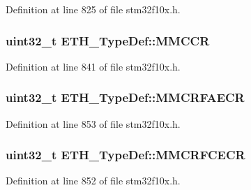 Definition at line 825 of file stm32f10x.\+h.

\subsubsection[{\texorpdfstring{M\+M\+C\+CR}{MMCCR}}]{ {\bf uint32\+\_\+t} E\+T\+H\+\_\+\+Type\+Def\+::\+M\+M\+C\+CR}\hypertarget{struct_e_t_h___type_def_a530d6551e73b9b616d8dc23a53e29708}{}\label{struct_e_t_h___type_def_a530d6551e73b9b616d8dc23a53e29708}


Definition at line 841 of file stm32f10x.\+h.

\subsubsection[{\texorpdfstring{M\+M\+C\+R\+F\+A\+E\+CR}{MMCRFAECR}}]{ {\bf uint32\+\_\+t} E\+T\+H\+\_\+\+Type\+Def\+::\+M\+M\+C\+R\+F\+A\+E\+CR}\hypertarget{struct_e_t_h___type_def_ad057b9031295ab3b64e79145f7607469}{}\label{struct_e_t_h___type_def_ad057b9031295ab3b64e79145f7607469}


Definition at line 853 of file stm32f10x.\+h.

\subsubsection[{\texorpdfstring{M\+M\+C\+R\+F\+C\+E\+CR}{MMCRFCECR}}]{ {\bf uint32\+\_\+t} E\+T\+H\+\_\+\+Type\+Def\+::\+M\+M\+C\+R\+F\+C\+E\+CR}\hypertarget{struct_e_t_h___type_def_afe50f13adc614758cba541f942e8ef0e}{}\label{struct_e_t_h___type_def_afe50f13adc614758cba541f942e8ef0e}


Definition at line 852 of file stm32f10x.\+h.

